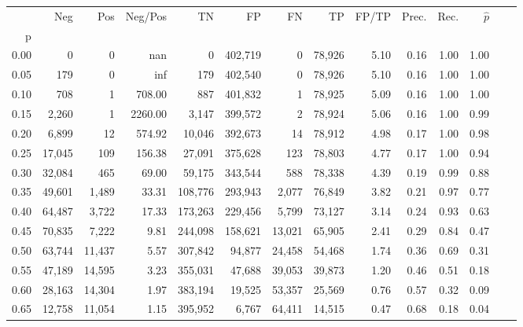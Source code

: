 \begin{tabular}{rrrrrrrrrrrrrr}
\toprule
{} &     Neg &     Pos &  Neg/Pos &       TN &       FP &      FN &      TP & FP/TP & Prec. &  Rec. & $\hat{p}$ \\
p    &         &         &          &          &          &         &         &       &       &       &           \\
\midrule
0.00 &       0 &       0 &      nan &        0 &  402,719 &       0 &  78,926 &  5.10 &  0.16 &  1.00 &      1.00 \\
0.05 &     179 &       0 &      inf &      179 &  402,540 &       0 &  78,926 &  5.10 &  0.16 &  1.00 &      1.00 \\
0.10 &     708 &       1 &   708.00 &      887 &  401,832 &       1 &  78,925 &  5.09 &  0.16 &  1.00 &      1.00 \\
0.15 &   2,260 &       1 &  2260.00 &    3,147 &  399,572 &       2 &  78,924 &  5.06 &  0.16 &  1.00 &      0.99 \\
0.20 &   6,899 &      12 &   574.92 &   10,046 &  392,673 &      14 &  78,912 &  4.98 &  0.17 &  1.00 &      0.98 \\
0.25 &  17,045 &     109 &   156.38 &   27,091 &  375,628 &     123 &  78,803 &  4.77 &  0.17 &  1.00 &      0.94 \\
0.30 &  32,084 &     465 &    69.00 &   59,175 &  343,544 &     588 &  78,338 &  4.39 &  0.19 &  0.99 &      0.88 \\
0.35 &  49,601 &   1,489 &    33.31 &  108,776 &  293,943 &   2,077 &  76,849 &  3.82 &  0.21 &  0.97 &      0.77 \\
0.40 &  64,487 &   3,722 &    17.33 &  173,263 &  229,456 &   5,799 &  73,127 &  3.14 &  0.24 &  0.93 &      0.63 \\
0.45 &  70,835 &   7,222 &     9.81 &  244,098 &  158,621 &  13,021 &  65,905 &  2.41 &  0.29 &  0.84 &      0.47 \\
0.50 &  63,744 &  11,437 &     5.57 &  307,842 &   94,877 &  24,458 &  54,468 &  1.74 &  0.36 &  0.69 &      0.31 \\
0.55 &  47,189 &  14,595 &     3.23 &  355,031 &   47,688 &  39,053 &  39,873 &  1.20 &  0.46 &  0.51 &      0.18 \\
0.60 &  28,163 &  14,304 &     1.97 &  383,194 &   19,525 &  53,357 &  25,569 &  0.76 &  0.57 &  0.32 &      0.09 \\
0.65 &  12,758 &  11,054 &     1.15 &  395,952 &    6,767 &  64,411 &  14,515 &  0.47 &  0.68 &  0.18 &      0.04 \\

\end{tabular}

